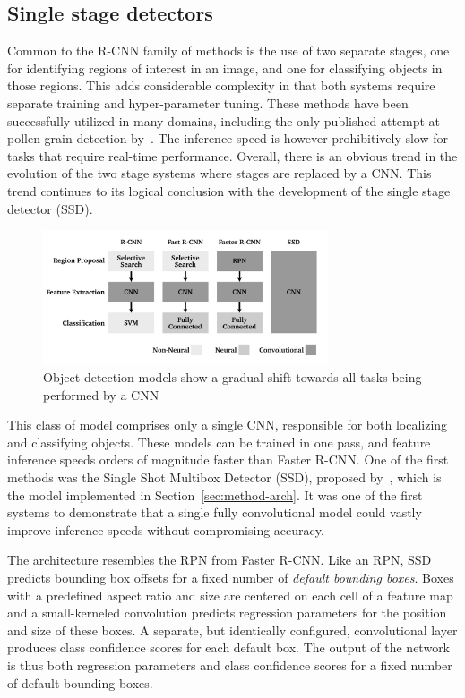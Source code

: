 \subsection{Single stage detectors}\label{sec:ssd}
Common to the R-CNN family of methods is the use of two separate stages, one for identifying regions of interest in an image, and one for classifying objects in those regions.
This adds considerable complexity in that both systems require separate training and hyper-parameter tuning.
These methods have been successfully utilized in many domains, including the only published attempt at pollen grain detection by\ \cite{gallardo_caballero_precise_2019}.
The inference speed is however prohibitively slow for tasks that require real-time performance.
Overall, there is an obvious trend in the evolution of the two stage systems where stages are replaced by a CNN\@.
This trend continues to its logical conclusion with the development of the single stage detector (SSD).

\begin{figure}[htbp]
    \centering
    \includegraphics[width=0.75\textwidth]{figs/related/detector_evolution.pdf}
    \caption[Evolution of object detection models]{Object detection models show a gradual shift towards all tasks being performed by a CNN}\label{fig:related-detectors}
  \end{figure}

This class of model comprises only a single CNN, responsible for both localizing and classifying objects.
These models can be trained in one pass, and feature inference speeds orders of magnitude faster than Faster R-CNN\@.
One of the first methods was the Single Shot Multibox Detector (SSD), proposed by\ \textcite{liu_ssd_2016}, which is the model implemented in Section~\ref{sec:method-arch}.
It was one of the first systems to demonstrate that a single fully convolutional model could vastly improve inference speeds without compromising accuracy.

The architecture resembles the RPN from Faster R-CNN\@.
Like an RPN, SSD predicts bounding box offsets for a fixed number of \textit{default bounding boxes}.
Boxes with a predefined aspect ratio and size are centered on each cell of a feature map and a small-kerneled convolution predicts regression parameters for the position and size of these boxes.
A separate, but identically configured, convolutional layer produces class confidence scores for each default box.
The output of the network is thus both regression parameters and class confidence scores for a fixed number of default bounding boxes.

